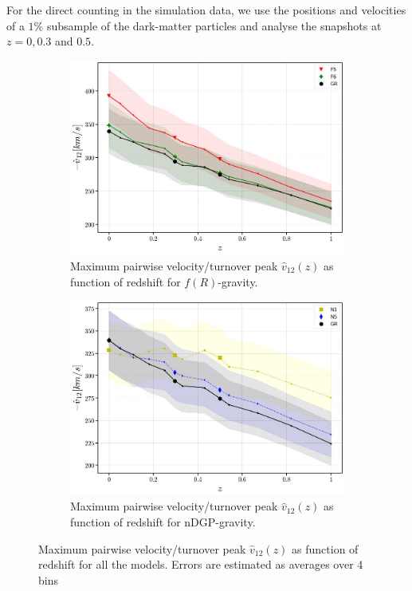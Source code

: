 \documentclass[%
 reprint,
groupedaddress,
nofootinbib,
nobibnotes,
 amsmath,amssymb,
 aps,
]{revtex4-2}
\newcommand{\<}{\langle}
\renewcommand{\>}{\rangle}
\begin{document}
For the direct counting in the simulation data, we use the positions and velocities of a $1\%$  subsample of the dark-matter particles and analyse the snapshots at $z = 0, 0.3$ and $0.5$. %




\begin{figure}
    \centering
    \begin{subfigure}[c]{0.45\textwidth}
         \includegraphics[width=\textwidth]{figs/Peak_v12_FofR_all_zs_cut_err.jpg}
         \caption{Maximum pairwise velocity/turnover peak $\hat{v}_{12}(z)$ as function of redshift for $f(R)$-gravity.}\label{fig:peakv12_fofr}
     \end{subfigure}
     \begin{subfigure}[c]{0.45\textwidth}
         \includegraphics[width=\textwidth]{figs/Peak_v12_nDFP_all_zs_cut_err.jpg}
         \caption{Maximum pairwise velocity/turnover peak $\hat{v}_{12}(z)$ as function of redshift for nDGP-gravity. }\label{fig:peakv12_ndgp}
     \end{subfigure}
    \caption{Maximum pairwise velocity/turnover peak $\hat{v}_{12}(z)$ as function of redshift for all the models. Errors are estimated as averages over 4 bins }\label{fig:peakv12}
\end{figure}
\end{document}
